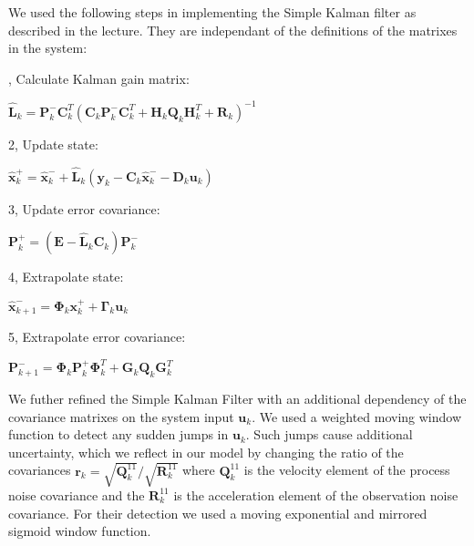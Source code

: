 \documentclass[class=article, crop=false]{standalone}
\begin{document}
\vspace{1cm}

We used the following steps in implementing the Simple Kalman filter as described in the lecture\cite{regelungssysteme1}. They are independant of the definitions of the matrixes in the system:

, Calculate Kalman gain matrix:
\begin{center}
$ \hat{\textbf{L}}_k = \textbf{P}^-_k \textbf{C}^T_k (\textbf{C}_k \textbf{P}^-_k \textbf{C}^T_k + \textbf{H}_k \textbf{Q}_k \textbf{H}^T_k + \textbf{R}_k)^{-1} $
\end{center}
\vspace{0.5cm}
2, Update state:
\begin{center}
$ \hat{\textbf{x}}^+_k = \hat{\textbf{x}}^-_k + \hat{\textbf{L}}_k (\textbf{y}_k - \textbf{C}_k \hat{\textbf{x}}^-_k - \textbf{D}_k \textbf{u}_k) $
\end{center}
\vspace{0.5cm}
3, Update error covariance:
\begin{center}
$ \textbf{P}^+_k = (\textbf{E} - \hat{\textbf{L}}_k \textbf{C}_k ) \textbf{P}^-_k $
\end{center}
\vspace{0.5cm}
4, Extrapolate state:
\begin{center}
$ \hat{\textbf{x}}^-_{k+1} = \boldsymbol{\Phi}_k \textbf{x}^+_k + \boldsymbol{\Gamma}_k \textbf{u}_k $
\end{center}
\vspace{0.5cm}
5, Extrapolate error covariance:
\begin{center}
$ \textbf{P}^-_{k+1} = \boldsymbol{\Phi}_k \textbf{P}^+_k \boldsymbol{\Phi}^T_k + \textbf{G}_k \textbf{Q}_k \textbf{G}^T_k $
\end{center}

\vspace{0.5cm}

We futher refined the Simple Kalman Filter with an additional dependency of the covariance matrixes on the system input $ \textbf{u}_k $. We used a weighted moving window function to detect any sudden jumps in $ \textbf{u}_k $. Such jumps cause additional uncertainty, which we reflect in our model by changing the ratio of the covariances $ \textbf{r}_{k} = \sqrt{\textbf{Q}^{11}_k }/\sqrt{\textbf{R}^{11}_k} $ where $ \textbf{Q}^{11}_k $ is the velocity element of the process noise covariance and the $ \textbf{R}^{11}_k $ is the acceleration element of the observation noise covariance. For their detection we used a moving exponential and mirrored sigmoid window function.
\end{document}
